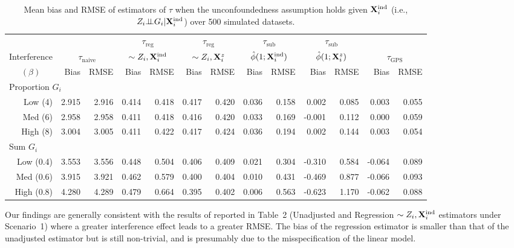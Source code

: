 \documentclass[10pt]{article}
\begin{document}
\begin{table}[ht]
\centering
{\footnotesize
\begin{tabular}{@{}rrrrrrrrrrrrr@{}}
\toprule
& & & \multicolumn{2}{c}{$\tau_\text{reg}$} & \multicolumn{2}{c}{$\tau_\text{reg}$} & \multicolumn{2}{c}{$\tau_\text{sub}$} & \multicolumn{2}{c}{$\tau_\text{sub}$}  \\
Interference & \multicolumn{2}{c}{$\tau_\text{naive}$} & \multicolumn{2}{c}{$\sim Z_i,\mathbf{X}^{\text{ind}}_i$} & \multicolumn{2}{c}{$\sim Z_i,\mathbf{X}^z_i$} & \multicolumn{2}{c}{$\hat{\phi}(1;\mathbf{X}^{\text{ind}}_i)$} & \multicolumn{2}{c}{$\hat{\phi}(1;\mathbf{X}^z_i)$} & \multicolumn{2}{c}{$\tau_\text{GPS}$} \\
\cmidrule(lr){2-3} \cmidrule(lr){4-5} \cmidrule(lr){6-7} \cmidrule(lr){8-9} \cmidrule(lr){10-11} \cmidrule(lr){12-13}
\multicolumn{1}{c}{$(\beta)$} & Bias & RMSE & Bias & RMSE & Bias & RMSE & Bias & RMSE & Bias & RMSE & Bias & RMSE \\
\midrule
\multicolumn{13}{l}{Proportion $G_i$} \\[0.5em]
Low (4) & 2.915 & 2.916 & 0.414 & 0.418 & 0.417 & 0.420 & 0.036 & 0.158 & 0.002 & 0.085 & 0.003 & 0.055 \\
Med (6) & 2.958 & 2.958 & 0.411 & 0.418 & 0.416 & 0.420 & 0.033 & 0.169 & -0.001 & 0.112 & 0.000 & 0.059 \\
High (8) & 3.004 & 3.005 & 0.411 & 0.422 & 0.417 & 0.424 & 0.036 & 0.194 & 0.002 & 0.144 & 0.003 & 0.054 \\[1em]
\multicolumn{13}{l}{Sum $G_i$} \\[0.5em]
Low (0.4) & 3.553 & 3.556 & 0.448 & 0.504 & 0.406 & 0.409 & 0.021 & 0.304 & -0.310 & 0.584 & -0.064 & 0.089 \\
Med (0.6) & 3.915 & 3.921 & 0.462 & 0.579 & 0.400 & 0.404 & 0.010 & 0.431 & -0.469 & 0.877 & -0.066 & 0.093 \\
High (0.8) & 4.280 & 4.289 & 0.479 & 0.664 & 0.395 & 0.402 & 0.006 & 0.563 & -0.623 & 1.170 & -0.062 & 0.088 \\
\bottomrule
\end{tabular}
}
\caption{Mean bias and RMSE of estimators of $\tau$ when the unconfoundedness assumption holds given $\mathbf{X}^{\text{ind}}_i$ (i.e., $Z_i{\perp\!\!\!\perp} G_i|\mathbf{X}^{\text{ind}}_i$) over 500 simulated datasets.}
\label{tab:table2}
\end{table}

Our findings are generally consistent with the results of \textcite{Forastiere:2021} reported in Table~2 (Unadjusted and Regression $\sim Z_i,\mathbf{X}^{\text{ind}}_i$ estimators under Scenario~1) where a greater interference effect leads to a greater RMSE. The bias of the regression estimator is smaller than that of the unadjusted estimator but is still non-trivial, and is presumably due to the misspecification of the linear model.
\end{document}
